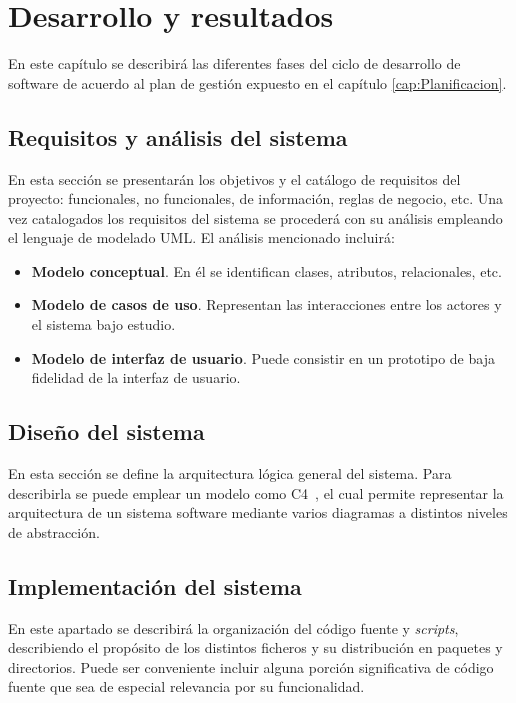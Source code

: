 \chapter{Desarrollo y resultados}
\label{cap:Desarrollo}

En este capítulo se describirá las diferentes fases del ciclo de desarrollo de software de acuerdo al plan de gestión expuesto en el capítulo \ref{cap:Planificacion}. 

\section{Requisitos y análisis del sistema}
En esta sección se presentarán los objetivos y el catálogo de requisitos del proyecto: funcionales, no funcionales, de información, reglas de negocio, etc. Una vez catalogados los requisitos del sistema se procederá con su análisis empleando el lenguaje de modelado UML. El análisis mencionado incluirá:
\begin{itemize}
\item \textbf{Modelo conceptual}. En él se identifican clases, atributos, relacionales, etc.

\item \textbf{Modelo de casos de uso}. Representan las interacciones entre los actores y el sistema bajo estudio.

\item \textbf{Modelo de interfaz de usuario}. Puede consistir en un prototipo de baja fidelidad de la interfaz de usuario.
\end{itemize}

\section{Diseño del sistema}
En esta sección se define la arquitectura lógica general del sistema. Para describirla se puede emplear un modelo como C4~\cite{Brown22}, el cual permite representar la arquitectura de un sistema software mediante varios diagramas a distintos niveles de abstracción.

\section{Implementación del sistema}
En este apartado se describirá la organización del código fuente y \emph{scripts}, describiendo el propósito de los distintos ficheros y su distribución en paquetes y directorios. Puede ser conveniente incluir alguna porción significativa de código fuente que sea de especial relevancia por su funcionalidad.

